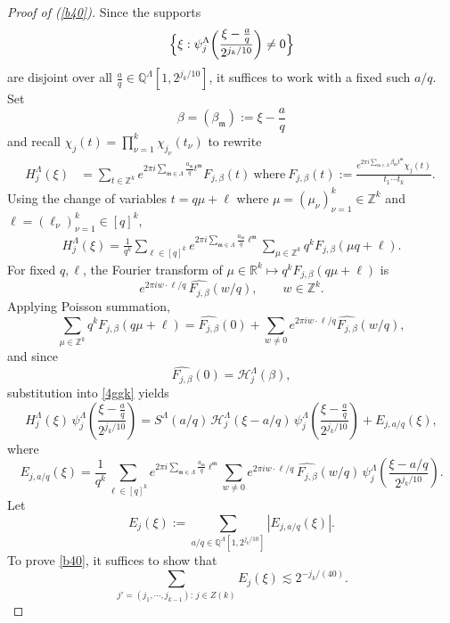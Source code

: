 \documentclass[11 pt,letterpaper]{amsart}
\theoremstyle{plain}
\theoremstyle{definition}
\theoremstyle{remark} \theoremstyle{exam} \theoremstyle{ob}
\numberwithin{equation}{section}
\begin{document}
 
\begin{proof}[Proof of  (\ref{b40})] 
Since the supports 
\[
\Bigl\{\xi:\psi_j^{\Lambda}\!\left(\frac{\xi-\frac{a}{q}}{2^{j_k/10}}\right)\neq 0\Bigr\}
\]
are disjoint over all $\frac{a}{q}\in\mathbb{Q}^{\Lambda}[1,2^{j_k/10}]$, it suffices to work with a fixed such $a/q$.  
Set
\[
\beta=(\beta_{\mathfrak m}) := \xi-\frac{a}{q}
\]
and recall  $\chi_j(t)=\prod_{\nu=1}^k \chi_{j_{\nu}}(t_\nu)$ to rewrite 
 \begin{align*}
  H^{\Lambda}_j(\xi) &= \sum_{t\in\mathbb{Z}^k} e^{2\pi i\sum_{\mathfrak{m}\in \Lambda}  
 \frac{a_{\mathfrak{m}}}{q} t^{\mathfrak{m}}}F_{j,\beta}(t) \ \text{where}\
 F_{j,\beta}(t):=\frac{e^{2\pi i \sum_{\mathfrak{m}\in \Lambda}  \beta_{\mathfrak{m}}t^{\mathfrak{m}} }\chi_j(t) }{t_1\cdots t_k}.\  
 \end{align*}
 Using the change of variables
  $t=q\mu+\ell$ where $\mu= (\mu_\nu)_{\nu=1}^k\in \mathbb{Z}^k$ and $\ell=(\ell_\nu)_{\nu=1}^k  \in [q]^k$,  
 \begin{align}\label{4ggk}
 H^{\Lambda}_j(\xi)  = \frac{1}{q^k} \sum_{\ell\in [q]^k} e^{2\pi  i\sum_{\mathfrak{m}\in \Lambda}  \frac{a_{\mathfrak{m}}}{q}\ell^{\mathfrak{m}}}\sum_{\mu\in\mathbb{Z}^k} q^k F_{j,\beta}(\mu q+\ell).
\end{align}
For fixed $q,\ell$, the Fourier transform of $\mu\in \mathbb{R}^k \mapsto q^k F_{j,\beta}(q\mu+\ell)$  is
\[
e^{2\pi i w\cdot \ell/q}\,\widehat{F_{j,\beta}}(w/q),\qquad w\in\mathbb{Z}^k.
\] 
Applying Poisson summation,
\[
\sum_{\mu\in\mathbb{Z}^k} q^kF_{j,\beta}(q\mu+\ell)
=
\widehat{F_{j,\beta}}(0)+
\sum_{w\neq 0}
e^{2\pi i w\cdot\ell/q}\widehat{F_{j,\beta}}(w/q),
\]
and since 
\[
\widehat{F_{j,\beta}}(0)=\mathcal{H}_j^{\Lambda}(\beta),
\]
substitution into \eqref{4ggk} yields
\[
H_j^\Lambda(\xi)\,
\psi_j^\Lambda\!\left(\frac{\xi-\frac{a}{q}}{2^{j_k/10}}\right)
=
S^\Lambda(a/q)\,
\mathcal{H}_j^\Lambda(\xi-a/q)\,
\psi_j^\Lambda\!\left(\frac{\xi-\frac{a}{q}}{2^{j_k/10}}\right)
+
E_{j,a/q}(\xi),
\]
where
\[
E_{j,a/q}(\xi)
=
\frac{1}{q^k}
\sum_{\ell\in[q]^k}
e^{2\pi i\sum_{\mathfrak m\in\Lambda}\frac{a_{\mathfrak m}}{q}\ell^{\mathfrak m}}
\sum_{w\neq 0}
e^{2\pi i w\cdot\ell/q}\,
\widehat{F_{j,\beta}}(w/q)\,
\psi_j^\Lambda\!\left(\frac{\xi-a/q}{2^{j_k/10}}\right).
\]
Let
\[
E_j(\xi):=\sum_{a/q\in\mathbb{Q}^{\Lambda}[1,2^{j_k/10}]} |E_{j,a/q}(\xi)|.
\]
To prove \eqref{b40}, it suffices to show that
\begin{equation*}
\sum_{j'=(j_1,\cdots,j_{k-1}):\, j\in Z(k)} E_j(\xi) \lesssim 2^{- j_k/(40)}.
\end{equation*}

\end{proof}
\end{document}
